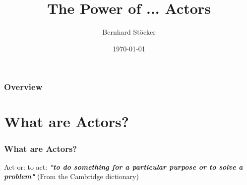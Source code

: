 \documentclass{beamer}
\title[The Power of Actors]{The Power of \cancel{LOVE}... Actors} %
\author{Bernhard St\"ocker} %
\institute[UCLA] %
{
Recogizer Group GmbH\\ %
\medskip
\textit{bernhard.stoecker@recogizer.de} %
}
\date{\today} %
\begin{document}
\begin{frame}
\titlepage %
\end{frame}

\begin{frame}
\frametitle{Overview} %
\tableofcontents %
\end{frame}


\section{What are Actors?} %


\begin{frame}
\frametitle{What are Actors?}
Act-or: to act: \textbf{\emph{"to do something for a particular purpose or to solve a problem"}} (From the Cambridge dictionary)
\end{frame}

\end{document}
